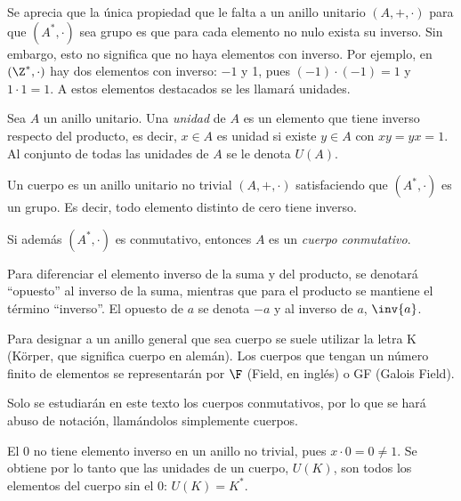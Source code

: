 Se aprecia que la única propiedad que le falta a un anillo unitario $(A, +, \cdot)$ para que $(A^*, \cdot)$ sea grupo es que para cada elemento no nulo exista su inverso. Sin embargo, esto no significa que no haya elementos con inverso. Por ejemplo, en $(\Z^*,\cdot)$ hay dos elementos con inverso: $-1$ y 1, pues $(-1) \cdot (-1) = 1 $ y $1 \cdot 1 = 1$. A estos elementos destacados se les llamará unidades.

\begin{deff}{\cite[p.~20]{GamboaAnillos}}
    Sea $A$ un anillo unitario. Una \textit{unidad} de $A$ es un elemento que tiene inverso respecto del producto, es decir, $x\in A$ es unidad si existe $y\in A$ con $xy = yx = 1$. Al conjunto de todas las unidades de $A$ se le denota $U(A)$.
\end{deff}

\begin{deff}[Cuerpo]{\cite[p.~20]{GamboaAnillos}}
    Un cuerpo es un anillo unitario no trivial $(A,+,\cdot)$ satisfaciendo que $(A^*,\cdot)$ es un grupo. Es decir, todo elemento distinto de cero tiene inverso.
    \item Si además $(A^*,\cdot)$ es conmutativo, entonces $A$ es un \textit{cuerpo conmutativo}.
    
\end{deff}

\begin{nott}
        \item Para diferenciar el elemento inverso de la suma y del producto, se denotará ``opuesto'' al inverso de la suma, mientras que para el producto se mantiene el término ``inverso''. El opuesto de $a$ se denota $-a$ y al inverso de $a$, $\inv{a}$.
        \item Para designar a un anillo general que sea cuerpo se suele utilizar la letra K (Körper, que significa cuerpo en alemán). Los cuerpos que tengan un número finito de elementos se representarán por $\F$ (Field, en inglés) o GF (Galois Field).
        \item Solo se estudiarán en este texto los cuerpos conmutativos, por lo que se hará abuso de notación, llamándolos simplemente cuerpos.
\end{nott}

\vspace{-0.3em}
\begin{obs}
    El 0 no tiene elemento inverso en un anillo no trivial, pues $x\cdot 0 = 0 \neq 1$. Se obtiene por lo tanto que las unidades de un cuerpo, $U(K)$, son todos los elementos del cuerpo sin el 0: $U(K) = K^*$.
\end{obs}


